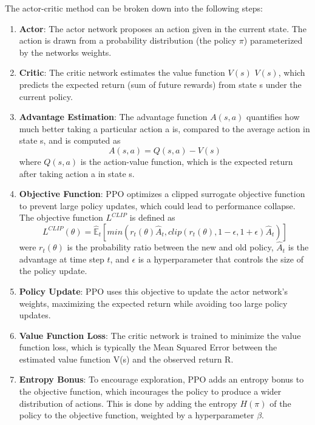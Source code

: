 The actor-critic method can be broken down into the following steps:
\begin{enumerate}
    \item \textbf{Actor}: The actor network proposes an action given in the current state. The action is drawn from a probability distribution (the policy $\pi$) parameterized by the networks weights.
    \item \textbf{Critic}: The critic network estimates the value function $V(s)$ $V(s)$, which predicts the expected return (sum of future rewards) from state s under the current policy.
    \item \textbf{Advantage Estimation}: The advantage function $A(s,a)$ quantifies how much better taking a particular action a is, compared to the average action in state s, and is computed as 
    \begin{equation}
        A(s,a) = Q(s,a) - V(s)
    \end{equation}
    where $Q(s,a)$ is the action-value function, which is the expected return after taking action a in state s.
    \item \textbf{Objective Function}:  PPO optimizes a clipped surrogate objective function to prevent large policy updates, which could lead to performance collapse. The objective function $L^{CLIP}$ is defined as
    \begin{equation}
        L^{CLIP}(\theta) = \hat{\mathbb{E}}_t[min(r_t(\theta)\hat{A}_t, clip(r_t(\theta), 1-\epsilon, 1+\epsilon)\hat{A}_t)]
    \end{equation}
    were $r_t(\theta)$ is the probability ratio between the new and old policy, $\hat{A}_t$ is the advantage at time step $t$, and $\epsilon$ is a hyperparameter that controls the size of the policy update.
    \item \textbf{Policy Update}: PPO uses this objective to update the actor network's weights, maximizing the expected return while avoiding too large policy updates.
    \item \textbf{Value Function Loss}: The critic network is trained to minimize the value function loss, which is typically the Mean Squared Error between the estimated value function V(s) and the observed return R.
    \item \textbf{Entropy Bonus}: To encourage exploration, PPO adds an entropy bonus to the objective function, which incourages the policy to produce a wider distribution of actions. This is done by adding the entropy $H(\pi)$ of the policy to the objective function, weighted by a hyperparameter $\beta$.
\end{enumerate}

